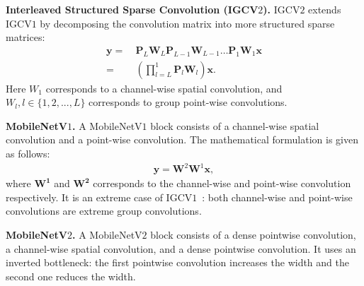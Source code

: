 \documentclass{bmvc2k}
\begin{document}
	\noindent\textbf{Interleaved Structured Sparse Convolution (IGCV$2$).}
	IGCV$2$ extends IGCV$1$
	by decomposing the convolution matrix into more structured sparse matrices:
	\begin{align}
	\mathbf{y} =~& \mathbf{P}_L\mathbf{W}_L \mathbf{P}_{L-1}\mathbf{W}_{L-1} \dots \mathbf{P}_1\mathbf{W}_1 \mathbf{x} \\
	=~& (\prod\nolimits_{l=L}^1 \mathbf{P}_l \mathbf{W}_l) \mathbf{x}.
	\label{eqn:ISSC}
	\end{align}
	Here $W_1$ corresponds to a channel-wise spatial convolution,
	and $W_l, l\in\{1,2,...,L\}$ corresponds to group point-wise convolutions.

	\noindent\textbf{MobileNetV$1$.}
	A MobileNetV$1$ block consists of a channel-wise spatial convolution
	and a point-wise convolution. The mathematical formulation
	is given as follows:
	\begin{align}
	\mathbf{y} = \mathbf{W}^2\mathbf{W}^1 \mathbf{x},
	\label{eqn:mnv1}
	\end{align}
	\noindent where $\mathbf{W^1}$ and $\mathbf{W^2}$ corresponds
	to the channel-wise and point-wise convolution respectively.
	It is an extreme case of IGCV$1$~\cite{zhang2017interleaved}:
	both channel-wise and point-wise convolutions
	are extreme group convolutions.

	\noindent\textbf{MobileNetV$2$.}
	A MobileNetV$2$ block consists of a dense pointwise convolution, a channel-wise spatial convolution, and a dense pointwise convolution.
	It uses an inverted bottleneck:
	the first pointwise convolution
	increases the width and
	the second one reduces the width.

	\iffalse
	Our empirical results show that the channel-wise spatial convolution
	can be conducted firstly,
	and accordingly it is mathematically formulated
	as
	\begin{align}
	\mathbf{y} = \mathbf{W}^2\mathbf{W}^1\mathbf{W}^0 \mathbf{{x}}
	\label{eqn:mnv2}
	\end{align}
	where $\mathbf{W}^0$
	corresponds to the channel-wise convolution,
	and $\mathbf{W}^1$, $\mathbf{W}^2$ are two low-rank matrices
	which correspond to the two dense point-wise convolutions.
	\fi
\end{document}
